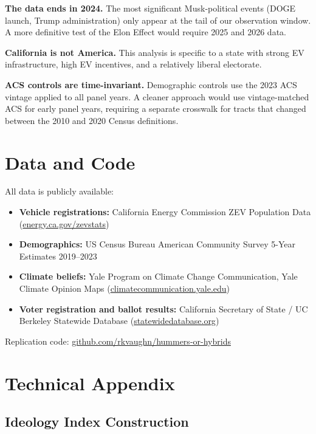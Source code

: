 \documentclass[12pt]{article}
\begin{document}
\textbf{The data ends in 2024.} The most significant Musk-political events (DOGE launch, Trump
administration) only appear at the tail of our observation window. A more definitive test
of the Elon Effect would require 2025 and 2026 data.

\textbf{California is not America.} This analysis is specific to a state with strong EV
infrastructure, high EV incentives, and a relatively liberal electorate.

\textbf{ACS controls are time-invariant.} Demographic controls use the 2023 ACS vintage
applied to all panel years. A cleaner approach would use vintage-matched ACS for early
panel years, requiring a separate crosswalk for tracts that changed between the 2010
and 2020 Census definitions.

\section{Data and Code}

All data is publicly available:

\begin{itemize}
  \item \textbf{Vehicle registrations:} California Energy Commission ZEV Population Data
    (\href{https://www.energy.ca.gov/zevstats}{energy.ca.gov/zevstats})
  \item \textbf{Demographics:} US Census Bureau American Community Survey 5-Year Estimates 2019--2023
  \item \textbf{Climate beliefs:} Yale Program on Climate Change Communication, Yale Climate Opinion
    Maps (\href{https://climatecommunication.yale.edu/visualizations-data/ycom-us/}{climatecommunication.yale.edu})
  \item \textbf{Voter registration and ballot results:} California Secretary of State / UC Berkeley
    Statewide Database (\href{https://statewidedatabase.org/}{statewidedatabase.org})
\end{itemize}

Replication code: \href{https://github.com/rkvaughn/hummers-or-hybrids}{github.com/rkvaughn/hummers-or-hybrids}

\appendix

\section{Technical Appendix}

\subsection{Ideology Index Construction}
\end{document}
